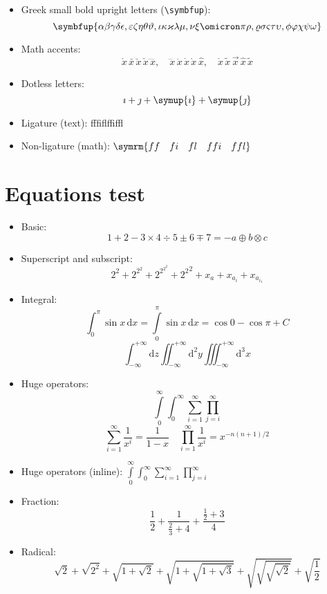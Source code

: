 \documentclass{article}
\def\greekalphabets{
  \alpha      \beta       \gamma      \delta      \epsilon   ,
  \varepsilon \zeta       \eta        \theta      \vartheta  ,
  \iota       \kappa      \varkappa   \lambda     \mu        ,
  \nu         \xi         \omicron    \pi         \rho       ,
  \varrho     \sigma      \varsigma   \tau        \upsilon   ,
  \phi        \varphi     \chi        \psi        \omega
}
\def\ligaturetext{ff\quad fi\quad fl\quad ffi\quad ffl}
\begin{document}
\begin{itemize}
  \item Greek small bold upright letters (\verb|\symbfup|):
        \[ \symbfup{\greekalphabets} \]

  \item Math accents:
        \[
          \acute{x}    \, \bar{x}   \, \breve{x} \, \check{x}   \, \ddddot{x}    , \quad
          \dddot{x}    \, \ddot{x}  \, \dot{x}   \, \grave{x}   \, \hat{x}       , \quad
          \mathring{x} \, \tilde{x} \, \vec{x}   \, \widehat{x} \, \widetilde{x}
        \]

  \item Dotless letters:
        \[ \imath + \jmath + \symup{\imath} + \symup{\jmath} \]

  \item Ligature (text): {\firatext\ligaturetext}

  \item Non-ligature (math): $ \symrm{\ligaturetext} $
\end{itemize}

\section{Equations test}

\begin{itemize}
  \item Basic:
        \[ 1 + 2 - 3 \times 4 \div 5 \pm 6 \mp 7 = -a \oplus b \otimes c \]

  \item Superscript and subscript:
        \[ 2^2 + 2^{2^2} + 2^{2^{2^2}} + {2^2}^2 + x_a + x_{a_i} + x_{a_{i_1}} \]

  \item Integral:
        \[
            \int_0^\pi        \sin x \, \mathrm{d} x
          = \int\limits_0^\pi \sin x \, \mathrm{d} x
          = \cos 0 - \cos\pi + C
        \]
        \[
          \int_{-\infty}^{+\infty}   \mathrm{d} z
          \iint_{-\infty}^{+\infty}  \mathrm{d}^2 y
          \iiint_{-\infty}^{+\infty} \mathrm{d}^3 x
        \]

  \item Huge operators:
        \[ \int\limits_0^\infty \int_0^\infty \sum_{i=1}^\infty \prod_{j=i}^\infty \]
        \[
          \sum_{i=1}^{\infty}  \frac{1}{x^i} = \frac{1}{1-x} \quad
          \prod_{i=1}^{\infty} \frac{1}{x^i} = x^{-n(n+1)/2}
        \]

  \item Huge operators (inline):
        $ \int\limits_0^\infty \int_0^\infty \sum_{i=1}^\infty \prod_{j=i}^\infty $

  \item Fraction:
        \[ \frac{1}{2} + \frac{1}{\frac{2}{3}+4} + \frac{\frac{1}{2}+3}{4} \]

  \item Radical:
        \[
            \sqrt{2} + \sqrt{2^2} + \sqrt{1+\sqrt{2}} + \sqrt{1+\sqrt{1+\sqrt{3}}}
          + \sqrt{\sqrt{\sqrt{\sqrt{2}}}} + \sqrt{\frac{1}{2}}
        \]
\end{itemize}
\end{document}
